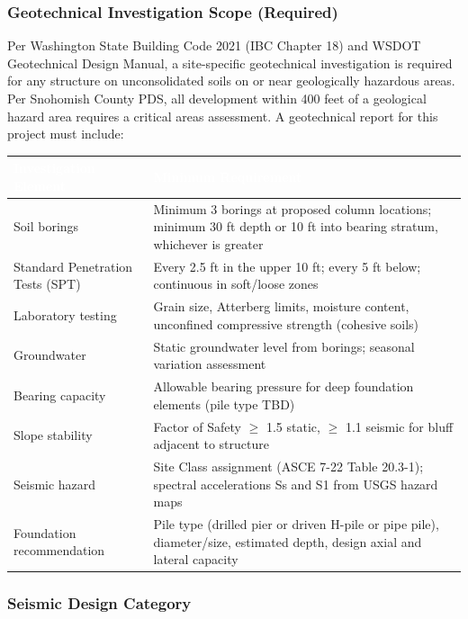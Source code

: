\documentclass[11pt,letterpaper]{article}
\newcommand{\tableheader}[1]{\textbf{\sffamily\textcolor{white}{#1}}}
\begin{document}
\subsubsection{Geotechnical Investigation Scope (Required)}

Per Washington State Building Code 2021 (IBC Chapter 18) and WSDOT Geotechnical Design Manual, a site-specific geotechnical investigation is required for any structure on unconsolidated soils on or near geologically hazardous areas. Per Snohomish County PDS, all development within 400 feet of a geological hazard area requires a critical areas assessment. A geotechnical report for this project must include:

\begin{center}
\begin{tabularx}{\textwidth}{L{4cm}X}
\toprule
{}
\tableheader{Investigation Element} & \tableheader{Minimum Requirement} \\
\midrule
Soil borings & Minimum 3 borings at proposed column locations; minimum 30 ft depth or 10 ft into bearing stratum, whichever is greater \\
Standard Penetration Tests (SPT) & Every 2.5 ft in the upper 10 ft; every 5 ft below; continuous in soft/loose zones \\
Laboratory testing & Grain size, Atterberg limits, moisture content, unconfined compressive strength (cohesive soils) \\
Groundwater & Static groundwater level from borings; seasonal variation assessment \\
Bearing capacity & Allowable bearing pressure for deep foundation elements (pile type TBD) \\
Slope stability & Factor of Safety $\geq$ 1.5 static, $\geq$ 1.1 seismic for bluff adjacent to structure \\
Seismic hazard & Site Class assignment (ASCE 7-22 Table 20.3-1); spectral accelerations Ss and S1 from USGS hazard maps \\
Foundation recommendation & Pile type (drilled pier or driven H-pile or pipe pile), diameter/size, estimated depth, design axial and lateral capacity \\
\bottomrule
\end{tabularx}
\end{center}

\subsubsection{Seismic Design Category}
\end{document}
